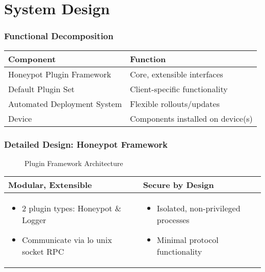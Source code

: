 \section{System Design}

\begin{frame}
\frametitle{Functional Decomposition}

\begin{tabular}{l | l}
\toprule
\textbf{Component} & \textbf{Function} \\
\midrule
Honeypot Plugin Framework & Core, extensible interfaces \\
Default Plugin Set & Client-specific functionality \\
Automated Deployment System & Flexible rollouts/updates \\
Device & Components installed on device(s) \\
\bottomrule
\end{tabular}

\end{frame}

\begin{frame}
\frametitle{Detailed Design: Honeypot Framework}

\begin{figure}
\centering
\caption{Plugin Framework Architecture}
{
\scalebox{0.7}{}
}
\end{figure}

\begin{table}
\centering
\small
\begin{tabularx}{\linewidth}{X X}
\textbf{Modular, Extensible} & \textbf{Secure by Design} \\
\midrule
\begin{itemize}[leftmargin=-0.3mm,after=\vspace{-\baselineskip},noitemsep,nolistsep]
    \item 2 plugin types: Honeypot \& Logger
    \item Communicate via lo unix socket RPC
\end{itemize}
&
\begin{itemize}[leftmargin=-0.3mm,after=\vspace{-\baselineskip},noitemsep,nolistsep]
    \item Isolated, non-privileged processes
    \item Minimal protocol functionality
\end{itemize} \\
\end{tabularx}
\end{table}
\end{frame}


